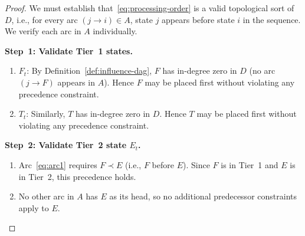 \documentclass[12pt,openany]{book}
\newcommand{\calE}{\mathcal{E}}
\newcommand{\calF}{\mathcal{F}}
\newcommand{\calT}{\mathcal{T}}
\numberwithin{equation}{chapter}
\theoremstyle{plain}
\theoremstyle{definition}
\theoremstyle{remark}
\def\mathcal#1{#1}%
\begin{document}
\begin{proof}
We must establish that~\eqref{eq:processing-order} is a valid
topological sort of $\mathcal{D}$, i.e., for every arc
$(j \to i) \in \mathcal{A}$, state $j$ appears before state
$i$ in the sequence.  We verify each arc in
$\mathcal{A}$ individually.

\medskip
\noindent\textbf{Step~1: Validate Tier~1 states.}
\begin{enumerate}
  \item $\calF_t$: By Definition~\ref{def:influence-dag},
        $\calF$ has in-degree zero in $\mathcal{D}$
        (no arc $(j\to\calF)$ appears in
        $\mathcal{A}$).  Hence $\calF$ may be placed
        first without violating any precedence constraint.
        \checkmark
  \item $\calT_t$: Similarly, $\calT$ has in-degree zero
        in $\mathcal{D}$.  Hence $\calT$ may be placed
        first without violating any precedence constraint.
        \checkmark
\end{enumerate}

\medskip
\noindent\textbf{Step~2: Validate Tier~2 state $\calE_t$.}
\begin{enumerate}
  \item Arc~\eqref{eq:arc1} requires $\calF \prec \calE$
        (i.e., $\calF$ before $\calE$).  Since $\calF$
        is in Tier~1 and $\calE$ is in Tier~2,
        this precedence holds.  \checkmark
  \item No other arc in $\mathcal{A}$ has $\calE$ as
        its head, so no additional predecessor
        constraints apply to $\calE$.  \checkmark
\end{enumerate}


\end{proof}
\end{document}
